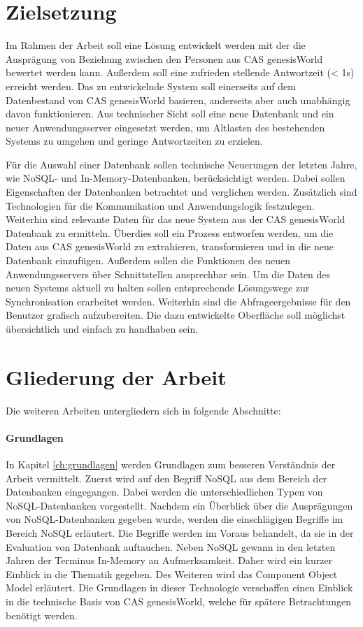\section{Zielsetzung}
\label{ch:Einfuehrung:sec:Zielsetzung}

Im Rahmen der Arbeit soll eine Lösung entwickelt werden mit der die Ausprägung von Beziehung zwischen den Personen aus CAS genesisWorld bewertet werden kann. Außerdem soll eine zufrieden stellende Antwortzeit (< 1s) erreicht werden. Das zu entwickelnde System soll einerseits auf dem Datenbestand von CAS genesisWorld basieren, anderseits aber auch unabhängig davon funktionieren. Aus technischer Sicht soll eine neue Datenbank und ein neuer Anwendungsserver eingesetzt werden, um Altlasten des bestehenden Systems zu umgehen und geringe Antwortzeiten zu erzielen. 

Für die Auswahl einer Datenbank sollen technische Neuerungen der letzten Jahre, wie NoSQL- und In-Memory-Datenbanken, berücksichtigt werden. Dabei sollen Eigenschaften der Datenbanken betrachtet und verglichen werden. Zusätzlich sind Technologien für die Kommunikation und Anwendungslogik festzulegen. Weiterhin sind relevante Daten für das neue System aus der CAS genesisWorld Datenbank zu ermitteln. Überdies soll ein Prozess entworfen werden, um die Daten aus CAS genesisWorld zu extrahieren, transformieren und in die neue Datenbank einzufügen. Außerdem sollen die Funktionen des neuen Anwendungsservers über Schnittstellen ansprechbar sein. Um die Daten des neuen Systems aktuell zu halten sollen entsprechende Lösungswege zur Synchronisation erarbeitet werden. Weiterhin sind die Abfrageergebnisse für den Benutzer grafisch aufzubereiten. Die dazu entwickelte Oberfläche soll möglichst übersichtlich und einfach zu handhaben sein.

\section{Gliederung der Arbeit}
\label{ch:Einfuehrung:sec:Gliederung}

Die weiteren Arbeiten untergliedern sich in folgende Abschnitte: 
 
\paragraph{Grundlagen} In Kapitel \ref{ch:grundlagen} werden Grundlagen zum besseren Verständnis der Arbeit vermittelt. Zuerst wird auf den Begriff NoSQL aus dem Bereich der Datenbanken eingegangen. Dabei werden die unterschiedlichen Typen von NoSQL-Datenbanken vorgestellt. Nachdem ein Überblick über die Ausprägungen von NoSQL-Datenbanken gegeben wurde, werden die einschlägigen Begriffe im Bereich NoSQL erläutert. Die Begriffe werden im Voraus behandelt, da sie in der Evaluation von Datenbank auftauchen. Neben NoSQL gewann in den letzten Jahren der Terminus In-Memory an Aufmerksamkeit. Daher wird ein kurzer Einblick in die Thematik gegeben. Des Weiteren wird das Component Object Model erläutert. Die Grundlagen in dieser Technologie verschaffen einen Einblick in die technische Basis von CAS genesisWorld, welche für spätere Betrachtungen benötigt werden. 

